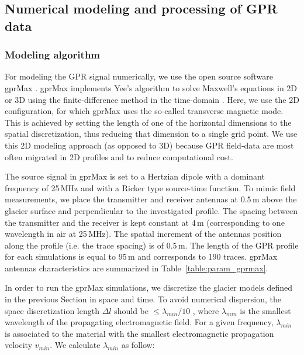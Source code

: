 \subsection{Numerical modeling and processing of GPR data}

\subsubsection{Modeling algorithm}

For modeling the GPR signal  numerically, we use the open source software gprMax \citep{Warren&al2016}. gprMax implements Yee's algorithm to solve Maxwell’s equations in 2D or 3D using the finite-difference method in the time-domain \citep[FDTD,][]{Kunz&Luebbers1993}. Here, we use the 2D configuration, for which gprMax uses the so-called transverse magnetic mode. This is achieved by setting the length of one of the horizontal dimensions to the spatial discretization, thus reducing that dimension to a single grid point. We use this 2D modeling approach (as opposed to 3D) because GPR field-data are most often migrated in 2D profiles and to reduce computational cost.

The source signal in gprMax is set to a Hertzian dipole with a dominant frequency of 25\,MHz \citep[a typical frequency for investigations on Apline glaciers; e.g.][]{Grab&al2021,Church&al2020} and with a Ricker type source-time function. To mimic field measurements, we place the transmitter and receiver antennas at 0.5\,m above the glacier surface and perpendicular to the investigated profile. The spacing between the transmitter and the receiver is kept constant at 4\,m (corresponding to one wavelength in air at 25\,MHz). The spatial increment of the antennas position along the profile (i.e. the trace spacing) is of 0.5\,m. The length of the GPR profile for each simulations is equal to 95\,m and corresponds to 190 traces. gprMax antennas characteristics are summarized in Table~\ref{table:param_gprmax}. 

In order to run the gprMax simulations, we discretize the glacier models defined in the previous Section in space and time. To avoid numerical dispersion, the space discretization length $\Delta l$ should be $\leq \lambda_{min} / 10$ \citep{Warren&al2016}, where $\lambda_{min}$ is the smallest wavelength of the propagating electromagnetic field. For a given frequency, $\lambda_{min}$ is associated to the material with the smallest electromagnetic propagation velocity $v_{min}$. We calculate $\lambda_{min}$ as follow:

